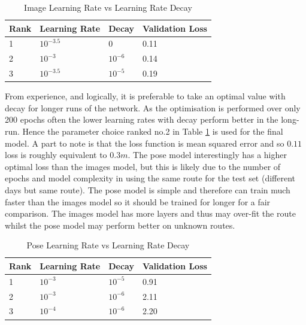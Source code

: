 \documentclass[11pt,twoside]{report}
\begin{document}
\noindent \begin{table}[h!]
	\centering
	\begin{tabular}{|p{1.0cm}|p{3.0cm}|p{3.0cm}|p{3.0cm}|}
		\hline
		\textbf{Rank}&\textbf{Learning Rate} & \textbf{Decay} &  \textbf{Validation Loss}       \\ \hline
		1  & $10^{-3.5}$   &   0 & 0.11     \\ \hline
		2  & $10^{-3}$   &   $10^{-6}$ & 0.14     \\ \hline
		3  & $10^{-3.5}$    &    $10^{-5}$ & 0.19   \\ \hline
		
	\end{tabular}
	\caption{Image Learning Rate vs Learning Rate Decay}
	\label{image_lr_lr_decay_table}
\end{table}

From experience, and logically, it is preferable to take an optimal value with decay for longer runs of the network. As the optimisation is performed over only 200 epochs often the lower learning rates with decay perform better in the long-run. Hence the parameter choice ranked no.2 in Table \ref{image_lr_lr_decay_table} is used for the final model. A part to note is that the loss function is mean squared error and so $0.11$ loss is roughly equivalent to $0.3m$. The pose model interestingly has a higher optimal loss than the images model, but this is likely due to the number of epochs and model complexity in using the same route for the test set (different days but same route). The pose model is simple and therefore can train much faster than the images model so it should be trained for longer for a fair comparison. The images model has more layers and thus may over-fit the route whilst the pose model may perform better on unknown routes.

\noindent \begin{table}[h!]
	\centering
	\begin{tabular}{|p{1.0cm}|p{3.0cm}|p{3.0cm}|p{3.0cm}|}
		\hline
		\textbf{Rank}&\textbf{Learning Rate} & \textbf{Decay} &  \textbf{Validation Loss}       \\ \hline
		1  & $10^{-3}$   &  $10^{-5}$ & 0.91     \\ \hline
		2  & $10^{-3}$   &   $10^{-6}$ & 2.11    \\ \hline
		3  & $10^{-4}$    &    $10^{-6}$ & 2.20   \\ \hline
		
	\end{tabular}
	\caption{Pose Learning Rate vs Learning Rate Decay}
	\label{pose_lr_lr_decay_table}
\end{table}
 
\end{document}
